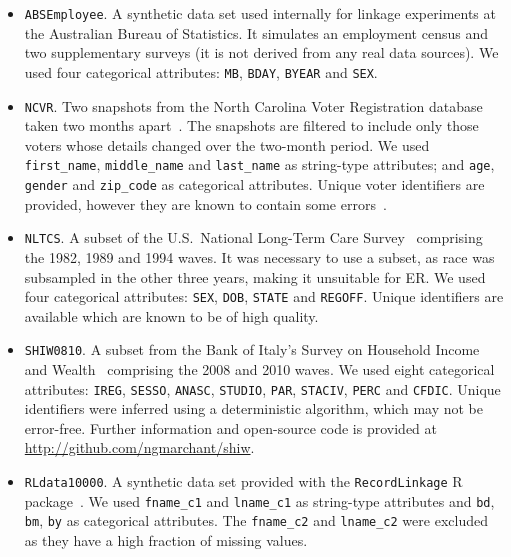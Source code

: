 \documentclass[12pt,letterpaper]{article}
\newcommand{\1}[1]{\mathbb{I}\!\left[#1\right]} %
\begin{document}
\begin{itemize}
  \item \texttt{ABSEmployee}. A synthetic data set used 
  internally for linkage experiments at the Australian Bureau of Statistics.
  It simulates an employment census and two supplementary 
  surveys (it is not derived from any real data sources).
  We used four categorical attributes: \texttt{MB}, \texttt{BDAY}, 
  \texttt{BYEAR} and \texttt{SEX}.
  \item \texttt{NCVR}. Two snapshots from the North Carolina 
  Voter Registration database taken two months 
  apart~\citep{christen_preparation_2014}.
  The snapshots are filtered to include only those voters 
  whose details changed over the two-month period.
  We used \texttt{first\_name}, \texttt{middle\_name} and 
  \texttt{last\_name} as string-type attributes; and 
  \texttt{age}, \texttt{gender} and \texttt{zip\_code} as 
  categorical attributes. 
  Unique voter identifiers are provided, however they are known to contain 
  some errors~\citep{christen_preparation_2014}.
  \item \texttt{NLTCS}. A subset of the U.S.\ National Long-Term 
  Care Survey~\citep{manton_nltcs_2010} comprising the 
  1982, 1989 and 1994 waves.
  It was necessary to use a subset, as race was subsampled in the other three 
  years, making it unsuitable for ER.
  We used four categorical attributes: \texttt{SEX}, \texttt{DOB}, 
  \texttt{STATE} and \texttt{REGOFF}.
  Unique identifiers are available which are known to be of high quality.
  \item \texttt{SHIW0810}. A subset from the Bank of Italy's 
  Survey on Household Income and Wealth~\citep{bancaitalia_2010} 
  comprising the 2008 and 2010 waves.
  We used eight categorical attributes: \texttt{IREG}, \texttt{SESSO}, 
  \texttt{ANASC}, \texttt{STUDIO}, \texttt{PAR}, \texttt{STACIV}, 
  \texttt{PERC} and \texttt{CFDIC}. 
  Unique identifiers were inferred using a deterministic algorithm, 
  which may not be error-free. 
  Further information and open-source code is provided at
  \url{http://github.com/ngmarchant/shiw}.
  \item \texttt{RLdata10000}. A synthetic data set provided 
  with the \texttt{RecordLinkage} R 
  package~\citep{sariyar_recordlinkage_2010}.
  We used \texttt{fname\_c1} and \texttt{lname\_c1} as string-type 
  attributes and \texttt{bd}, \texttt{bm}, \texttt{by} as categorical 
  attributes. 
  The \texttt{fname\_c2} and \texttt{lname\_c2} were excluded as they 
  have a high fraction of missing values.
\end{itemize}
\end{document}
